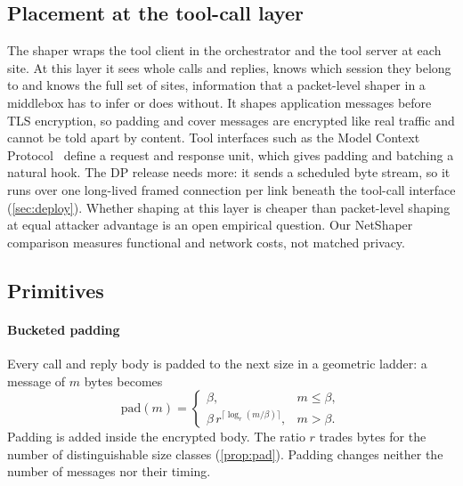 \subsection{Placement at the tool-call layer}
The shaper wraps the tool client in the orchestrator and the tool server at each site. At this layer it sees whole calls and replies, knows which session they belong to and knows the full set of sites, information that a packet-level shaper in a middlebox has to infer or does without. It shapes application messages before TLS encryption, so padding and cover messages are encrypted like real traffic and cannot be told apart by content. Tool interfaces such as the Model Context Protocol~\cite{mcp2026spec} define a request and response unit, which gives padding and batching a natural hook. The DP release needs more: it sends a scheduled byte stream, so it runs over one long-lived framed connection per link beneath the tool-call interface (\cref{sec:deploy}). Whether shaping at this layer is cheaper than packet-level shaping at equal attacker advantage is an open empirical question. Our NetShaper comparison measures functional and network costs, not matched privacy.

\subsection{Primitives}

\paragraph{Bucketed padding} Every call and reply body is padded to the next size in a geometric ladder: a message of $m$ bytes becomes
\begin{equation}\label{eq:pad}
\mathrm{pad}(m)=\begin{cases}\beta, & m\le\beta,\\ \beta\, r^{\lceil \log_r (m/\beta)\rceil}, & m>\beta.\end{cases}
\end{equation}
Padding is added inside the encrypted body. The ratio $r$ trades bytes for the number of distinguishable size classes (\cref{prop:pad}). Padding changes neither the number of messages nor their timing.

